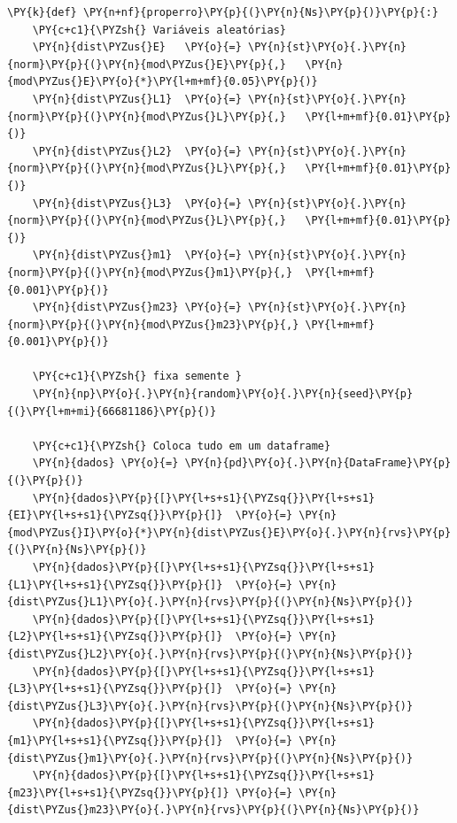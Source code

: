     \begin{tcolorbox}[breakable, size=fbox, boxrule=1pt, pad at break*=1mm,colback=cellbackground, colframe=cellborder]
\begin{Verbatim}[commandchars=\\\{\}]
\PY{k}{def} \PY{n+nf}{properro}\PY{p}{(}\PY{n}{Ns}\PY{p}{)}\PY{p}{:}
    \PY{c+c1}{\PYZsh{} Variáveis aleatórias}
    \PY{n}{dist\PYZus{}E}   \PY{o}{=} \PY{n}{st}\PY{o}{.}\PY{n}{norm}\PY{p}{(}\PY{n}{mod\PYZus{}E}\PY{p}{,}   \PY{n}{mod\PYZus{}E}\PY{o}{*}\PY{l+m+mf}{0.05}\PY{p}{)}
    \PY{n}{dist\PYZus{}L1}  \PY{o}{=} \PY{n}{st}\PY{o}{.}\PY{n}{norm}\PY{p}{(}\PY{n}{mod\PYZus{}L}\PY{p}{,}   \PY{l+m+mf}{0.01}\PY{p}{)}
    \PY{n}{dist\PYZus{}L2}  \PY{o}{=} \PY{n}{st}\PY{o}{.}\PY{n}{norm}\PY{p}{(}\PY{n}{mod\PYZus{}L}\PY{p}{,}   \PY{l+m+mf}{0.01}\PY{p}{)}
    \PY{n}{dist\PYZus{}L3}  \PY{o}{=} \PY{n}{st}\PY{o}{.}\PY{n}{norm}\PY{p}{(}\PY{n}{mod\PYZus{}L}\PY{p}{,}   \PY{l+m+mf}{0.01}\PY{p}{)}
    \PY{n}{dist\PYZus{}m1}  \PY{o}{=} \PY{n}{st}\PY{o}{.}\PY{n}{norm}\PY{p}{(}\PY{n}{mod\PYZus{}m1}\PY{p}{,}  \PY{l+m+mf}{0.001}\PY{p}{)} 
    \PY{n}{dist\PYZus{}m23} \PY{o}{=} \PY{n}{st}\PY{o}{.}\PY{n}{norm}\PY{p}{(}\PY{n}{mod\PYZus{}m23}\PY{p}{,} \PY{l+m+mf}{0.001}\PY{p}{)} 

    \PY{c+c1}{\PYZsh{} fixa semente }
    \PY{n}{np}\PY{o}{.}\PY{n}{random}\PY{o}{.}\PY{n}{seed}\PY{p}{(}\PY{l+m+mi}{66681186}\PY{p}{)}

    \PY{c+c1}{\PYZsh{} Coloca tudo em um dataframe}
    \PY{n}{dados} \PY{o}{=} \PY{n}{pd}\PY{o}{.}\PY{n}{DataFrame}\PY{p}{(}\PY{p}{)}
    \PY{n}{dados}\PY{p}{[}\PY{l+s+s1}{\PYZsq{}}\PY{l+s+s1}{EI}\PY{l+s+s1}{\PYZsq{}}\PY{p}{]}  \PY{o}{=} \PY{n}{mod\PYZus{}I}\PY{o}{*}\PY{n}{dist\PYZus{}E}\PY{o}{.}\PY{n}{rvs}\PY{p}{(}\PY{n}{Ns}\PY{p}{)}
    \PY{n}{dados}\PY{p}{[}\PY{l+s+s1}{\PYZsq{}}\PY{l+s+s1}{L1}\PY{l+s+s1}{\PYZsq{}}\PY{p}{]}  \PY{o}{=} \PY{n}{dist\PYZus{}L1}\PY{o}{.}\PY{n}{rvs}\PY{p}{(}\PY{n}{Ns}\PY{p}{)}
    \PY{n}{dados}\PY{p}{[}\PY{l+s+s1}{\PYZsq{}}\PY{l+s+s1}{L2}\PY{l+s+s1}{\PYZsq{}}\PY{p}{]}  \PY{o}{=} \PY{n}{dist\PYZus{}L2}\PY{o}{.}\PY{n}{rvs}\PY{p}{(}\PY{n}{Ns}\PY{p}{)}
    \PY{n}{dados}\PY{p}{[}\PY{l+s+s1}{\PYZsq{}}\PY{l+s+s1}{L3}\PY{l+s+s1}{\PYZsq{}}\PY{p}{]}  \PY{o}{=} \PY{n}{dist\PYZus{}L3}\PY{o}{.}\PY{n}{rvs}\PY{p}{(}\PY{n}{Ns}\PY{p}{)}
    \PY{n}{dados}\PY{p}{[}\PY{l+s+s1}{\PYZsq{}}\PY{l+s+s1}{m1}\PY{l+s+s1}{\PYZsq{}}\PY{p}{]}  \PY{o}{=} \PY{n}{dist\PYZus{}m1}\PY{o}{.}\PY{n}{rvs}\PY{p}{(}\PY{n}{Ns}\PY{p}{)}
    \PY{n}{dados}\PY{p}{[}\PY{l+s+s1}{\PYZsq{}}\PY{l+s+s1}{m23}\PY{l+s+s1}{\PYZsq{}}\PY{p}{]} \PY{o}{=} \PY{n}{dist\PYZus{}m23}\PY{o}{.}\PY{n}{rvs}\PY{p}{(}\PY{n}{Ns}\PY{p}{)}
    

\end{Verbatim}
\end{tcolorbox}
